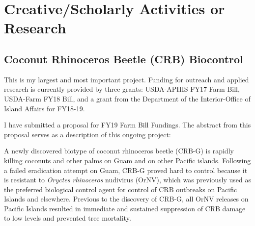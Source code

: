 \documentclass[12pt,english]{scrartcl}
\begin{document}
\begin{comment}

\raggedright\vspace{2mm}\textbf{Activity}
\begin{itemize}
\item On-line output \cite{moore2018onlinecatalog,moore2018textitcitripestis2,moore2018textitcitripestis,moore2018lobatelac2,moore2018scanuniversity,moore2017website,moore2018insectpin,moore2018checklist,moore2018citripestis,moore2018lobatelac,manuel2017pacific,moore2018inaturalist,moore2018interactive,moore2017listof,moore2017guamforestry,moore2017crbgarticlereview,moore2017crbtrap,moore2017techblog,moore2017scaevoladieback,moore2017failedattempt,moore2017publish,moore2017usingscrapy,moore2017tweeking,moore2017install,moore2017setting,moore2017usingthe,moore2017finding,moore2017usingscrapy2,moore2017calculate,moore2017converting,moore2017migrate,moore2018croppestlist}
\end{itemize}
\raggedright\vspace{2mm}\textbf{Reference(s)}

\begin{btSect}[vancouver]{zotero}
\btPrintCited
\end{btSect}
\newpage{}
\end{comment}

\section{Creative/Scholarly Activities or Research}

\subsection{\label{sec:Coconut-Rhinoceros-Beetle}Coconut Rhinoceros Beetle (CRB)
Biocontrol}

This is my largest and most important project. Funding for outreach
and applied research is currently provided by three grants: USDA-APHIS
FY17 Farm Bill, USDA-Farm FY18 Bill, and a grant from the Department
of the Interior-Office of Island Affairs for FY18-19.

I have submitted a proposal for FY19 Farm Bill Fundings. The abstract
from this proposal serves as a description of this ongoing project:

A newly discovered biotype of coconut rhinoceros beetle (CRB-G) is
rapidly killing coconuts and other palms on Guam and on other Pacific
islands. Following a failed eradication attempt on Guam, CRB-G proved
hard to control because it is resistant to \emph{Oryctes rhinoceros}
nudivirus (OrNV), which was previously used as the preferred biological
control agent for control of CRB outbreaks on Pacific Islands and
elsewhere. Previous to the discovery of CRB-G, all OrNV releases on
Pacific Islands resulted in immediate and sustained suppression of
CRB damage to low levels and prevented tree mortality.
\end{document}
